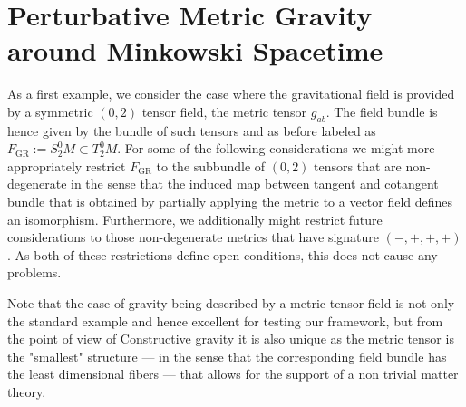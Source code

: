 \section{Perturbative Metric Gravity around Minkowski Spacetime}
As a first example, we consider the case where the gravitational field is provided by a symmetric $(0,2)$ tensor field, the metric tensor $g_{ab}$. The field bundle is hence given by the bundle of such tensors and as before labeled as $F_{\text{GR}} := S^0_2M \subset T^0_2M$. For some of the following considerations we might more appropriately restrict $F_{\text{GR}}$ to the subbundle of $(0,2)$ tensors that are non-degenerate in the sense that the induced map between tangent and cotangent bundle that is obtained by partially applying the metric to a vector field defines an isomorphism. Furthermore, we additionally might restrict future considerations to those non-degenerate metrics that have signature $(-,+,+,+)$. As both of these restrictions define open conditions, this does not cause any problems.

Note that the case of gravity being described by a metric tensor field is not only the standard example and hence excellent for testing our framework, but from the point of view of Constructive gravity it is also unique as the metric tensor is the "smallest" structure --- in the sense that the corresponding field bundle has the least dimensional fibers --- that allows for the support of a non trivial matter theory.

